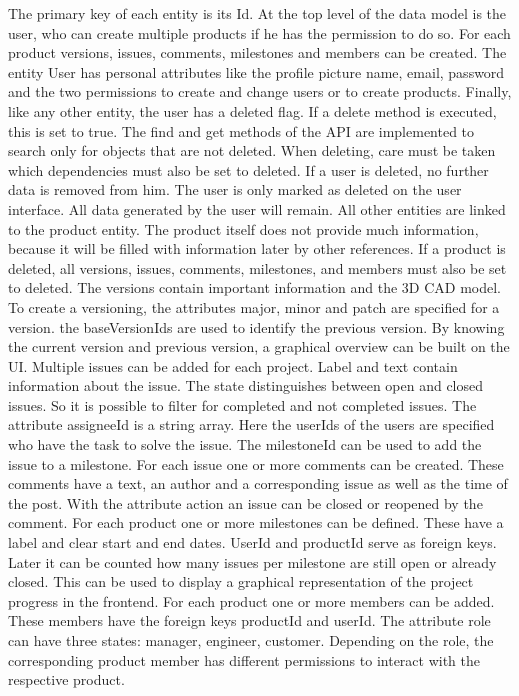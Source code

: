     The primary key of each entity is its Id. At the top level of the data model is the user, who can create multiple products if he has the permission to do so. For each product versions, issues, comments, milestones and members can be created. The entity User has personal attributes like the profile picture name, email, password and the two permissions to create and change users or to create products. Finally, like any other entity, the user has a deleted flag. If a delete method is executed, this is set to true. The find and get methods of the API are implemented to search only for objects that are not deleted. When deleting, care must be taken which dependencies must also be set to deleted. If a user is deleted, no further data is removed from him. The user is only marked as deleted on the user interface. All data generated by the user will remain. All other entities are linked to the product entity. The product itself does not provide much information, because it will be filled with information later by other references. If a product is deleted, all versions, issues, comments, milestones, and members must also be set to deleted. The versions contain important information and the 3D CAD model. To create a versioning, the attributes major, minor and patch are specified for a version. the baseVersionIds are used to identify the previous version. By knowing the current version and previous version, a graphical overview can be built on the UI. Multiple issues can be added for each project. Label and text contain information about the issue. The state distinguishes between open and closed issues. So it is possible to filter for completed and not completed issues. The attribute assigneeId is a string array. Here the userIds of the users are specified who have the task to solve the issue. The milestoneId can be used to add the issue to a milestone. For each issue one or more comments can be created. These comments have a text, an author and a corresponding issue as well as the time of the post. With the attribute action an issue can be closed or reopened by the comment. For each product one or more milestones can be defined. These have a label and clear start and end dates. UserId and productId serve as foreign keys. Later it can be counted how many issues per milestone are still open or already closed. This can be used to display a graphical representation of the project progress in the frontend. For each product one or more members can be added. These members have the foreign keys productId and userId. The attribute role can have three states: manager, engineer, customer. Depending on the role, the corresponding product member has different permissions to interact with the respective product.

